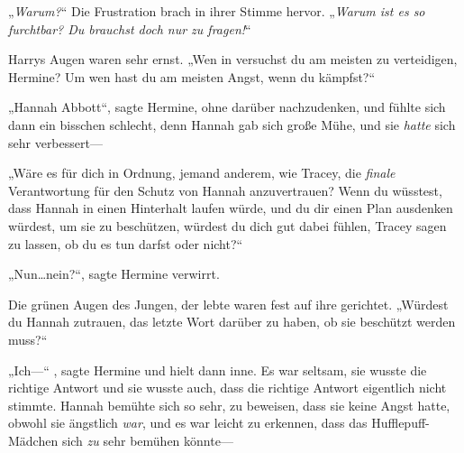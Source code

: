 „\emph{Warum?}“ Die Frustration brach in ihrer Stimme hervor. „\emph{Warum ist es so furchtbar? Du brauchst doch nur zu fragen!}“

Harrys Augen waren sehr ernst. „Wen in \SPHEW versuchst du am meisten zu verteidigen, Hermine? Um wen hast du am meisten Angst, wenn du kämpfst?“

„Hannah Abbott“, sagte Hermine, ohne darüber nachzudenken, und fühlte sich dann ein bisschen schlecht, denn Hannah gab sich große Mühe, und sie \emph{hatte} sich sehr verbessert—

„Wäre es für dich in Ordnung, jemand anderem, wie Tracey, die \emph{finale} Verantwortung für den Schutz von Hannah anzuvertrauen? Wenn du wüsstest, dass Hannah in einen Hinterhalt laufen würde, und du dir einen Plan ausdenken würdest, um sie zu beschützen, würdest du dich gut dabei fühlen, Tracey sagen zu lassen, ob du es tun darfst oder nicht?“

„Nun…nein?“, sagte Hermine verwirrt.

Die grünen Augen des Jungen, der lebte waren fest auf ihre gerichtet. „Würdest du Hannah zutrauen, das letzte Wort darüber zu haben, ob sie beschützt werden muss?“

„Ich—“ , sagte Hermine und hielt dann inne. Es war seltsam, sie wusste die richtige Antwort und sie wusste auch, dass die richtige Antwort eigentlich nicht stimmte. Hannah bemühte sich so sehr, zu beweisen, dass sie keine Angst hatte, obwohl sie ängstlich \emph{war}, und es war leicht zu erkennen, dass das Hufflepuff-Mädchen sich \emph{zu} sehr bemühen könnte—

